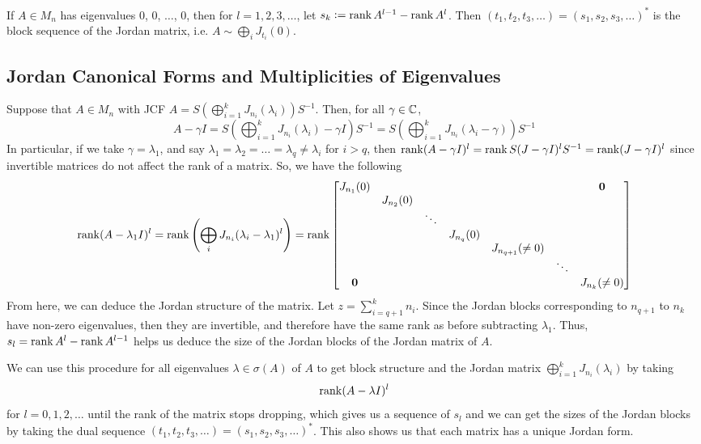 \begin{proposition}
\label{prop:block-seq-Jordan-matrix}
If $A \in M_n$ has eigenvalues 0, 0, $\dots$, 0, then for $l = 1, 2, 3, \dots$, let $s_k \vcentcolon= \operatorname{rank} A^{l-1} - \operatorname{rank} A^l$. Then $(t_1, t_2, t_3, \dots) = (s_1, s_2, s_3, \dots)^*$ is the block sequence of the Jordan matrix, i.e. $A \sim \bigoplus_i J_{t_i}(0)$.
\end{proposition}

\subsection{Jordan Canonical Forms and Multiplicities of Eigenvalues}
Suppose that $A \in M_n$ with JCF $A = S\left(\bigoplus_{i=1}^k J_{n_i}(\lambda_i)\right)S^{-1}$. Then, for all $\gamma \in \mathbb C$, 
$$
A - \gamma I 
    = S\left(\bigoplus_{i=1}^k J_{n_i}(\lambda_i) - \gamma I\right) S^{-1} 
    = S\left(\bigoplus_{i=1}^k J_{n_i}(\lambda_i - \gamma)\right)S^{-1}
$$
In particular, if we take $\gamma = \lambda_1$, and say $\lambda_1 = \lambda_2 = \dots = \lambda_q \not= \lambda_i$ for $i > q$, then $\operatorname{rank} (A - \gamma I)^l = \operatorname{rank} S(J-\gamma I)^l S^{-1} = \operatorname{rank} (J-\gamma I)^l$ since invertible matrices do not affect the rank of a matrix. So, we have the following
$$
\operatorname{rank} (A-\lambda_1 I)^l 
    = \operatorname{rank}\left(\bigoplus_i J_{n_i}(\lambda_i - \lambda_1)^l\right) 
    = \operatorname{rank} 
        \begin{bmatrix} 
            J_{n_1}(0) & & & & & & \mathbf{0} \\ 
            & J_{n_2}(0) & & & & &   \\ 
            & & \ddots & & & & \\ 
            & & & J_{n_q}(0) & & & \\ 
            & & & & J_{n_{q+1}}(\not=0) & & \\ 
            & & & & & \ddots & \\ 
            \mathbf{0}   & & & & & & J_{n_k}(\not=0)
        \end{bmatrix} 
$$
From here, we can deduce the Jordan structure of the matrix. Let $z = \sum_{i=q+1}^k n_i$. Since the Jordan blocks corresponding to $n_{q+1}$ to $n_k$ have non-zero eigenvalues, then they are invertible, and therefore have the same rank as before subtracting $\lambda_1$. Thus, $s_l = \operatorname{rank} A^l - \operatorname{rank} A^{l-1}$ helps us deduce the size of the Jordan blocks of the Jordan matrix of $A$.

\noindent We can use this procedure for all eigenvalues $\lambda \in \sigma(A)$ of $A$ to get block structure and the Jordan matrix $\bigoplus_{i=1}^k J_{n_i}(\lambda_i)$ by taking
$$
\operatorname{rank}(A-\lambda I)^l
$$
for $l = 0, 1, 2, \dots$ until the rank of the matrix stops dropping, which gives us a sequence of $s_l$ and we can get the sizes of the Jordan blocks by taking the dual sequence $(t_1, t_2, t_3, \dots) = (s_1, s_2, s_3, \dots)^*$. This also shows us that each matrix has a unique Jordan form. \\

